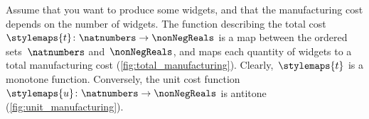 \begin{example}
    Assume that you want to produce some widgets, and that the manufacturing cost depends on the number of widgets.
    The function describing the total cost~$\stylemaps{t}\colon \natnumbers\to \nonNegReals$ is a map between the ordered sets~$\natnumbers$ and~$\nonNegReals$, and maps each quantity of widgets to a total manufacturing cost (\cref{fig:total_manufacturing}).
    Clearly,~$\stylemaps{t}$ is a monotone function.
    Conversely, the unit cost function~$\stylemaps{u}\colon \natnumbers\to \nonNegReals$ is antitone (\cref{fig:unit_manufacturing}).
\end{example}

\begin{figure}[h!]
\end{figure}

